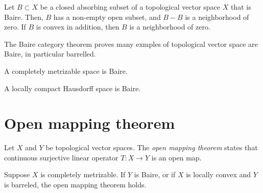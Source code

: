 \documentclass{../../large}
\begin{document}
\begin{prb}
Let $B\subset X$ be a closed absorbing subset of a topological vector space $X$ that is Baire.
Then, $B$ has a non-empty open subset, and $B-B$ is a neighborhood of zero.
If $B$ is convex in addition, then $B$ is a neighborhood of zero.
\end{prb}


\begin{prb}
The Baire category theorem proves many exmples of topological vector space are Baire, in particular barrelled.
\begin{parts}
\item A completely metrizable space is Baire.
\item A locally compact Hausdorff space is Baire.
\end{parts}
\end{prb}




\section{Open mapping theorem}

\begin{prb}
Let $X$ and $Y$ be topological vector spaces.
The \emph{open mapping theorem} states that continuous surjective linear operator $T:X\to Y$ is an open map.
\begin{parts}
\item Suppose $X$ is completely metrizable. If $Y$ is Baire, or if $X$ is locally convex and $Y$ is barreled, the open mapping theorem holds.
\end{parts}
\end{prb}
\end{document}
